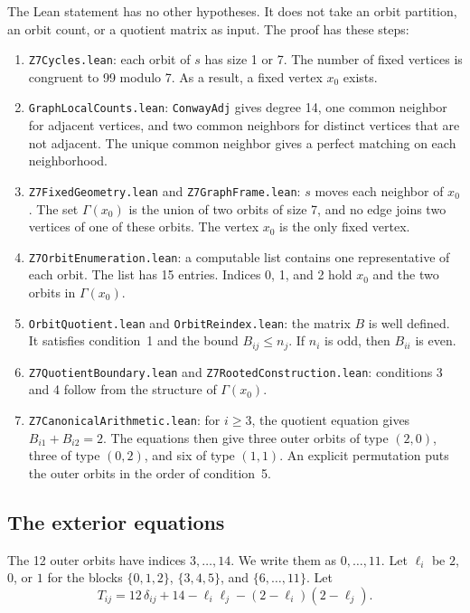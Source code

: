 \documentclass{article}
\theoremstyle{plain}
\theoremstyle{definition}
\numberwithin{equation}{section}
\begin{document}
The Lean statement has no other hypotheses. It does not take an orbit partition, an orbit count, or a quotient matrix as input. The proof has these steps:
\begin{enumerate}
 \item \texttt{Z7Cycles.lean}: each orbit of $s$ has size 1 or 7. The number of fixed vertices is congruent to 99 modulo 7. As a result, a fixed vertex $x_0$ exists.
 \item \texttt{GraphLocalCounts.lean}: \texttt{ConwayAdj} gives degree 14, one common neighbor for adjacent vertices, and two common neighbors for distinct vertices that are not adjacent. The unique common neighbor gives a perfect matching on each neighborhood.
 \item \texttt{Z7FixedGeometry.lean} and \texttt{Z7GraphFrame.lean}: $s$ moves each neighbor of $x_0$. The set $\Gamma(x_0)$ is the union of two orbits of size 7, and no edge joins two vertices of one of these orbits. The vertex $x_0$ is the only fixed vertex.
 \item \texttt{Z7OrbitEnumeration.lean}: a computable list contains one representative of each orbit. The list has 15 entries. Indices 0, 1, and 2 hold $x_0$ and the two orbits in $\Gamma(x_0)$.
 \item \texttt{OrbitQuotient.lean} and \texttt{OrbitReindex.lean}: the matrix $B$ is well defined. It satisfies condition~1 and the bound $B_{ij} \le n_j$. If $n_i$ is odd, then $B_{ii}$ is even.
 \item \texttt{Z7QuotientBoundary.lean} and \texttt{Z7RootedConstruction.lean}: conditions 3 and 4 follow from the structure of $\Gamma(x_0)$.
 \item \texttt{Z7CanonicalArithmetic.lean}: for $i \ge 3$, the quotient equation gives $B_{i1} + B_{i2} = 2$. The equations then give three outer orbits of type $(2, 0)$, three of type $(0, 2)$, and six of type $(1, 1)$. An explicit permutation puts the outer orbits in the order of condition~5.
\end{enumerate}

\subsection{The exterior equations}

The 12 outer orbits have indices $3, \dots, 14$. We write them as $0, \dots, 11$. Let $\ell_i$ be $2$, $0$, or $1$ for the blocks $\{0,1,2\}$, $\{3,4,5\}$, and $\{6, \dots, 11\}$. Let
\begin{equation}
 T_{ij} = 12\,\delta_{ij} + 14 - \ell_i \ell_j - (2 - \ell_i)(2 - \ell_j).
 \label{eq:target}
\end{equation}
\end{document}
